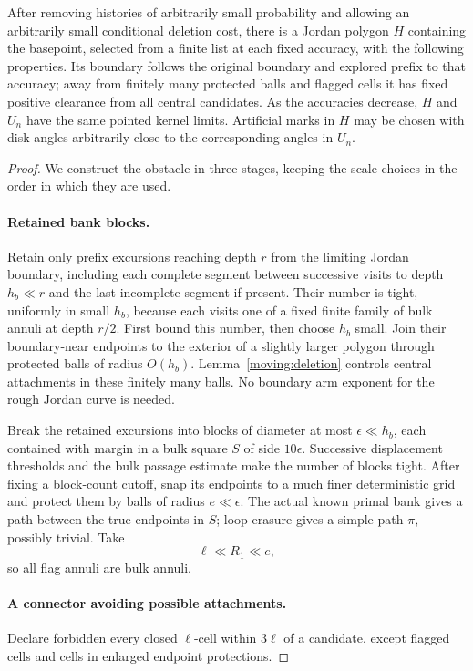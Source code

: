 \begin{lemma}\label{moving:obstacle}
After removing histories of arbitrarily small probability and allowing
an arbitrarily small conditional deletion cost, there is a Jordan
polygon $H$ containing the basepoint, selected from a finite list at
each fixed accuracy, with the following properties.
Its boundary follows the original boundary and explored prefix to
that accuracy; away from finitely many protected balls and flagged
cells it has fixed positive clearance from all central candidates.
As the accuracies decrease, $H$ and $U_n$ have the same pointed kernel
limits.  Artificial marks in $H$ may be chosen with disk angles
arbitrarily close to the corresponding angles in $U_n$.
\end{lemma}
\begin{proof}
We construct the obstacle in three stages, keeping the scale choices
in the order in which they are used.

\paragraph{Retained bank blocks.}
Retain only prefix
excursions reaching depth $r$ from the limiting Jordan boundary,
including each complete segment between successive visits to depth
$h_b\ll r$ and the last incomplete segment if present.  Their number
is tight, uniformly in small $h_b$, because each visits one of a fixed
finite family of bulk annuli at depth $r/2$.  First bound this number,
then choose $h_b$ small.  Join their boundary-near endpoints to the
exterior of a slightly larger polygon through protected balls of
radius $O(h_b)$.  Lemma~\ref{moving:deletion} controls central
attachments in these finitely many balls.  No boundary arm exponent
for the rough Jordan curve is needed.

Break the retained excursions into blocks of diameter at most
$\epsilon\ll h_b$, each contained with margin in a bulk square $S$
of side $10\epsilon$.  Successive displacement thresholds and the
bulk passage estimate make the number of blocks tight.  After fixing
a block-count cutoff, snap its endpoints to a much finer deterministic
grid and protect them by balls of radius $e\ll\epsilon$.  The actual
known primal bank gives a path between the true endpoints in $S$;
loop erasure gives a simple path $\pi$, possibly trivial.  Take
\[
 \ell\ll R_1\ll e,
\]
so all flag annuli are bulk annuli.

\paragraph{A connector avoiding possible attachments.}
Declare forbidden every closed
$\ell$-cell within $3\ell$ of a candidate, except flagged cells and
cells in enlarged endpoint protections.


\end{proof}
